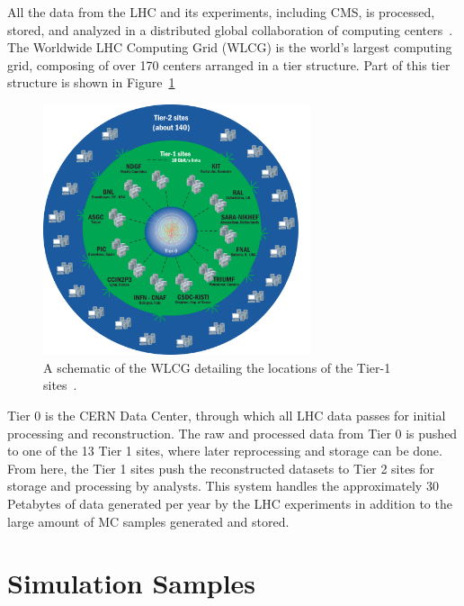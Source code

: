 All the data from the LHC and its experiments, including CMS, is processed, stored, and analyzed
in a distributed global collaboration of computing centers~\cite{Eck:840543}. The Worldwide
LHC Computing Grid (WLCG) is the world's largest computing grid, composing of over 170 centers
arranged in a tier structure. Part of this tier structure is shown in Figure~\ref{fig:cerncomputing}

\begin{figure}[ht]
 \begin{center}
    \includegraphics[width=0.70\textwidth]{figures/data/CCApr13-Tiers0-1-2_PNG-file.pdf}
      \end{center}
\caption{A schematic of the WLCG detailing the locations of the Tier-1 sites~\cite{cern:computing}.}
\label{fig:cerncomputing}
\end{figure}

Tier 0 is the CERN Data Center, through which all LHC data passes for initial processing and
reconstruction. The raw and processed data from Tier 0 is pushed to one of the 13 Tier 1 sites, where
later reprocessing and storage can be done. From here, the Tier 1 sites push the reconstructed
datasets to Tier 2 sites for storage and processing by analysts. This system handles the approximately
30 Petabytes of data generated per year by the LHC experiments in addition to the large amount of
MC samples generated and stored.

\section{Simulation Samples\label{sec:sim}}


